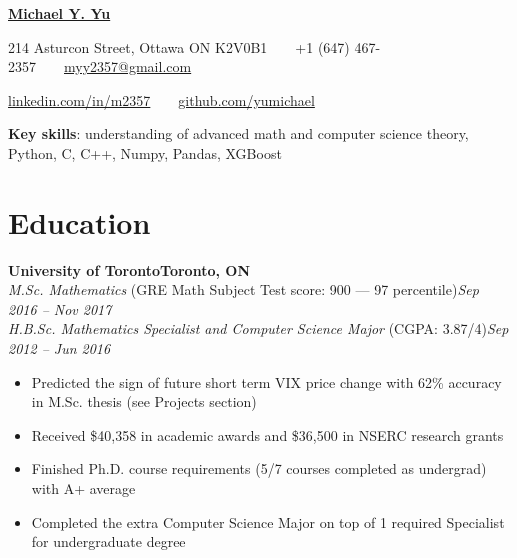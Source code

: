 \documentclass[10pt,letterpaper]{article}
\newcommand*\company[1]{\textbf{#1}}
\newcommand*\position[1]{\textit{#1}}
\newcommand*\location\company
\newcommand*\timespan\position
\begin{document}
\pagestyle{empty}
\begin{center}
{\huge\textbf{\href{https://github.com/yumichael/resume-v5}{Michael Y. Yu}}}

214 Asturcon Street, Ottawa ON K2V0B1\ \ \textbullet\ \ +1 (647) 467-2357\ \ \textbullet\ \ \href{mailto:myy2357@gmail.com}{myy2357@gmail.com}

\href{https://www.linkedin.com/in/m2357/}{linkedin.com/in/m2357}\ \ \textbullet\ \ \href{https://github.com/yumichael}{github.com/yumichael}
\end{center}
\textbf{Key skills}: understanding of advanced math and computer science theory, Python, C, C++, Numpy, Pandas, XGBoost

\section*{Education}
\company{University of Toronto}\hfill\location{Toronto, ON}\\
\position{M.Sc. Mathematics} (GRE Math Subject Test score: 900 --- 97 percentile)\hfill\timespan{Sep 2016 -- Nov 2017}
\\
\position{H.B.Sc. Mathematics Specialist and Computer Science Major} (CGPA: 3.87/4)\hfill\timespan{Sep 2012 -- Jun 2016}
\begin{itemize}
\item Predicted the sign of future short term VIX price change with 62\% accuracy in M.Sc. thesis (see Projects section)
\item Received \$40,358 in academic awards and \$36,500 in NSERC research grants
\item Finished Ph.D. course requirements (5/7 courses completed as undergrad) with A+ average
\item Completed the extra Computer Science Major on top of 1 required Specialist for undergraduate degree
\end{itemize}
\end{document}
